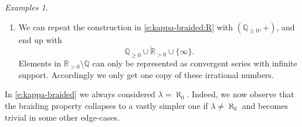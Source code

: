 \documentclass[a4paper,11pt,oneside]{amsart}
\theoremstyle{remark}
\newtheorem{examples}[teor]{Examples}
\newcommand{\bQ}{\mathbb Q}
\newcommand{\bR}{\mathbb R}
\begin{document}
\begin{examples}
\begin{enumerate}
    We can construct an $\aleph_0$-monoid that is braided over $\bR_{\ge 0}$ as follows.
    Let $\widetilde{\bR}_{>0}$ denote a disjoint copy of $\bR_{>0}$ in which we denote the element corresponding to $a \in \bR_{>0}$ by $\widetilde a$.
    Let
    \[
      H \coloneqq \bR_{\ge 0} \cup \widetilde{\bR}_{>0} \cup \{\infty\}.
    \]
    Note that there is only one copy of $0$ and of $\infty$.
    For $(a_i)_{i \ge 0} \in H^{\aleph_0}$, let $a=\sum_{i=0}^\infty a_i \in \bR_{\ge 0} \cup \{ \infty \}$ be the sum of the convergent series of real numbers (disregarding whether the elements of the sequence live in $\bR_{\ge 0}$ or in $\widetilde \bR_{>0}$).
    If $a=\infty$, we define the $\aleph_0$-sum to be $\sum_{i \in \aleph_0} a_i \coloneqq \infty$.
    Suppose $a$ is finite.
    If all $a_i$ are in $\bR_{\ge 0}$ and the family has finite support, we set $\sum_{i \in \aleph_0} a_i \coloneqq a \in \bR_{\ge 0}$.
    Otherwise, that is, if the family has infinite support or one $a_i$ is in $\widetilde{\bR}_{> 0}$, we set $\sum_{i \in \aleph_0} a_i \coloneqq \widetilde{a}$.
    Then $H$ is $\aleph_0^-$-braided over $\bR_{\ge 0}$, as two families in $\bR_{\ge 0}$ have the same $\aleph_0$-sum in $H$ if and only if they are braided.
    However $H$ is \emph{not} $\aleph_0^-$-braided over itself, as we can repeat the same argument that showed $\bR_{\ge 0} \cup \{\infty\}$ is not $\aleph_0^-$-braided over $\bR_{\ge 0}$ with the elements in $\{0\} \cup \widetilde{\bR}_{>0}$.

  \item \label{e:kappa-braided:Q} We can repeat the construction in \ref{e:kappa-braided:R} with $(\bQ_{\ge 0}, +)$, and end up with
    \[
      \bQ_{\ge 0} \cup \widetilde{\bR}_{>0} \cup \{\infty\}.
    \]
    Elements in $\bR_{>0} \setminus \bQ$ can only be represented as convergent series with infinite support.
    Accordingly we only get one copy of these irrational numbers.
  \end{enumerate}
\end{examples}

In \cref{e:kappa-braided} we always considered $\lambda=\aleph_0$.
Indeed, we now observe that the braiding property collapses to a vastly simpler one if $\lambda \ne \aleph_0$ and becomes trivial in some other edge-cases.
\end{document}
